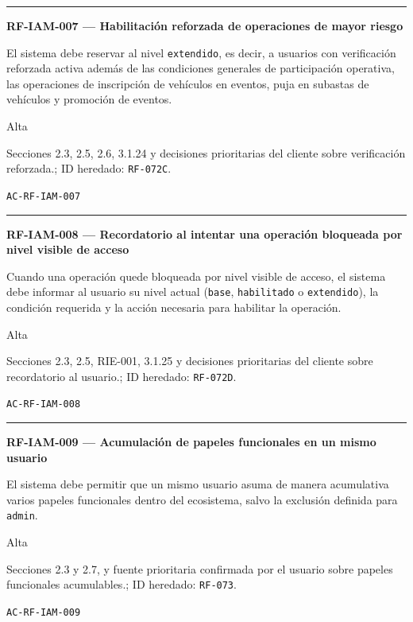 \documentclass[10pt,letterpaper]{article}
\begin{document}
\vspace{0.25em}\hrule\vspace{0.65em}
\noindent\textbf{RF-IAM-007 --- Habilitación reforzada de operaciones de mayor riesgo}\par
\begin{description}[style=nextline,leftmargin=3.15cm,labelwidth=2.8cm,font=\normalfont\bfseries]
\item[Obligación] El sistema debe reservar al nivel \texttt{extendido}, es decir, a usuarios con verificación reforzada activa además de las condiciones generales de participación operativa, las operaciones de inscripción de vehículos en eventos, puja en subastas de vehículos y promoción de eventos.
\item[Prioridad] Alta
\item[Procedencia] Secciones 2.3, 2.5, 2.6, 3.1.24 y decisiones prioritarias del cliente sobre verificación reforzada.; ID heredado: \texttt{RF-072C}.
\item[Verificación] \texttt{AC-RF-IAM-007}
\end{description}
\vspace{0.25em}\hrule\vspace{0.65em}
\noindent\textbf{RF-IAM-008 --- Recordatorio al intentar una operación bloqueada por nivel visible de acceso}\par
\begin{description}[style=nextline,leftmargin=3.15cm,labelwidth=2.8cm,font=\normalfont\bfseries]
\item[Obligación] Cuando una operación quede bloqueada por nivel visible de acceso, el sistema debe informar al usuario su nivel actual (\texttt{base}, \texttt{habilitado} o \texttt{extendido}), la condición requerida y la acción necesaria para habilitar la operación.
\item[Prioridad] Alta
\item[Procedencia] Secciones 2.3, 2.5, RIE-001, 3.1.25 y decisiones prioritarias del cliente sobre recordatorio al usuario.; ID heredado: \texttt{RF-072D}.
\item[Verificación] \texttt{AC-RF-IAM-008}
\end{description}
\vspace{0.25em}\hrule\vspace{0.65em}
\noindent\textbf{RF-IAM-009 --- Acumulación de papeles funcionales en un mismo usuario}\par
\begin{description}[style=nextline,leftmargin=3.15cm,labelwidth=2.8cm,font=\normalfont\bfseries]
\item[Obligación] El sistema debe permitir que un mismo usuario asuma de manera acumulativa varios papeles funcionales dentro del ecosistema, salvo la exclusión definida para \texttt{admin}.
\item[Prioridad] Alta
\item[Procedencia] Secciones 2.3 y 2.7, y fuente prioritaria confirmada por el usuario sobre papeles funcionales acumulables.; ID heredado: \texttt{RF-073}.
\item[Verificación] \texttt{AC-RF-IAM-009}
\end{description}
\end{document}
